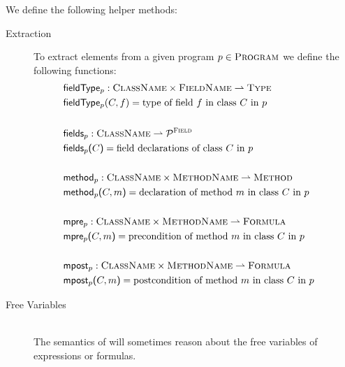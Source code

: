 We define the following helper methods:

\begin{description}
    \item[Extraction]
    To extract elements from a given program $p \in \textup{\textsc{Program}}$ we define the following functions:
    \begin{align*}
    	 & \textup{\textsf{fieldType$_p$}} : \textup{\textsc{ClassName}} \times \textup{\textsc{FieldName}} \rightharpoonup \textup{\textsc{Type}}                & ~ \\
    	 & \textup{\textsf{fieldType$_p$}}(C, f) = \text{type of field $f$ in class $C$ in $p$}                         &  \\
    	 & ~                                                                                       &  \\
    	 & \textup{\textsf{fields$_p$}} : \textup{\textsc{ClassName}} \rightharpoonup \mathcal{P}^{\textup{\textsc{Field}}}                  &  \\
    	 & \textup{\textsf{fields$_p$($C$)}} = \text{field declarations of class $C$ in $p$}                              &  \\
    	 & ~                                                                                       &  \\
    	 & \textup{\textsf{method$_p$}} : \textup{\textsc{ClassName}} \times \textup{\textsc{MethodName}} \rightharpoonup \textup{\textsc{Method}} &  \\
    	 & \textup{\textsf{method$_p$($C, m$)}} = \text{declaration of method $m$ in class $C$ in $p$}                   &  \\
    	 & ~                                                                                       &  \\
    	 & \textup{\textsf{mpre$_p$}} : \textup{\textsc{ClassName}} \times \textup{\textsc{MethodName}} \rightharpoonup \textup{\textsc{Formula}}  &  \\
    	 & \textup{\textsf{mpre$_p$($C, m$)}} = \text{precondition of method $m$ in class $C$ in $p$}                    &  \\
    	 & ~                                                                                       &  \\
    	 & \textup{\textsf{mpost$_p$}} : \textup{\textsc{ClassName}} \times \textup{\textsc{MethodName}} \rightharpoonup \textup{\textsc{Formula}} &  \\
    	 & \textup{\textsf{mpost$_p$($C, m$)}} = \text{postcondition of method $m$ in class $C$ in $p$}                   &
    \end{align*}
    
    \item[Free Variables]~\\
    The semantics of \svlidf will sometimes reason about the free variables of expressions or formulas.
    

\end{description}
